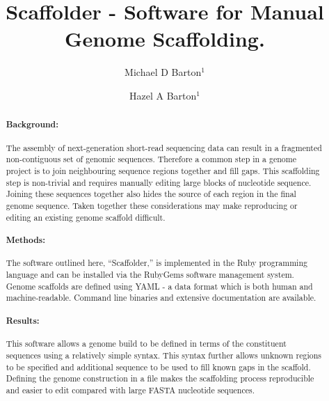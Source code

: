 \documentclass[10pt]{bmc_article}
\newenvironment{bmcformat}{\begin{raggedright}\baselineskip20pt\sloppy\setboolean{publ}{false}}{\end{raggedright}\baselineskip20pt\sloppy}
\begin{document}
\begin{bmcformat}

\title{Scaffolder - Software for Manual Genome
Scaffolding.}

\author{
  Michael D Barton$^{1}$\correspondingauthor%
\and
  Hazel A Barton$^{1}$%
      }


\address{
\iid(1) Biology Department, The University of Akron, Akron, %
OH 44325-3908, USA}

\maketitle

\clearpage

\begin{abstract} %

  \paragraph*{Background:} The assembly of next-generation short-read
  sequencing data can result in a fragmented non-contiguous set of genomic
  sequences. Therefore a common step in a genome project is to join
  neighbouring sequence regions together and fill gaps. This scaffolding step
  is non-trivial and requires manually editing large blocks of nucleotide
  sequence. Joining these sequences together also hides the source of each
  region in the final genome sequence. Taken together these considerations
  may make reproducing or editing an existing genome scaffold difficult.

  \paragraph*{Methods:} The software outlined here, ``Scaffolder,'' is
  implemented in the Ruby programming language and can be installed via the
  RubyGems software management system. Genome scaffolds are defined using
  YAML - a data format which is both human and machine-readable. Command line
  binaries and extensive documentation are available.

  \paragraph*{Results:} This software allows a genome build to be defined in
  terms of the constituent sequences using a relatively simple syntax. This
  syntax further allows unknown regions to be specified and additional sequence
  to be used to fill known gaps in the scaffold. Defining the genome construction
  in a file makes the scaffolding process reproducible and easier to edit
  compared with large FASTA nucleotide sequences.


\end{abstract}
\end{bmcformat}
\end{document}
